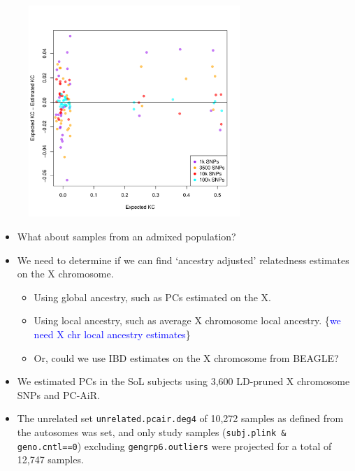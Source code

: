 \documentclass{beamer}
\begin{document}
\begin{frame}
\centering
\begin{figure}
\includegraphics[height=8cm]{../xchr_kc_estimatedVsTrue_MM.pdf}
\end{figure}
\end{frame}

\begin{frame}
\begin{itemize}
\item What about samples from an admixed population?
\item We need to determine if we can find `ancestry adjusted' relatedness estimates on the X chromosome.
\begin{itemize}
	\item Using global ancestry, such as PCs estimated on the X. 
	\item Using local ancestry, such as average X chromosome local ancestry. \{\textcolor{blue}{we need X chr local ancestry estimates}\}
\item Or, could we use IBD estimates on the X chromosome from BEAGLE?
\end{itemize}
\end{itemize}
\end{frame}

\begin{frame}
\begin{itemize}
\item We estimated PCs in the SoL subjects using 3,600 LD-pruned X chromosome SNPs and PC-AiR.
\item The unrelated set \texttt{unrelated.pcair.deg4} of 10,272 samples as defined from the autosomes was set, and only study samples (\texttt{subj.plink \& geno.cntl==0}) excluding \texttt{gengrp6.outliers} were projected for a total of 12,747 samples.
\end{itemize}
\end{frame}
\end{document}
